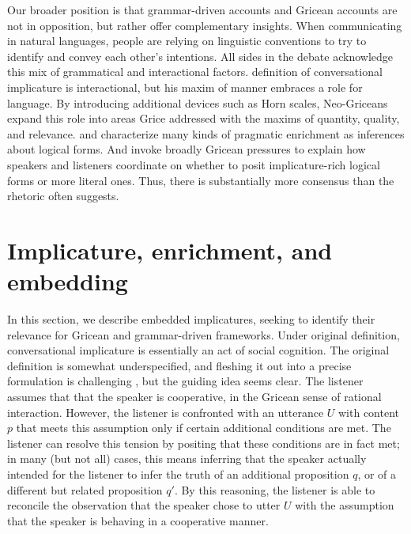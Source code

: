 \documentclass[leqno,12pt]{article}
\begin{document}
Our broader position is that grammar-driven accounts and Gricean
accounts are not in opposition, but rather offer complementary
insights.  When communicating in natural languages, people are relying
on linguistic conventions to try to identify and convey each other's
intentions. All sides in the debate acknowledge this mix of
grammatical and interactional factors.  definition
of conversational implicature is interactional, but his maxim of
manner embraces a role for language. By introducing additional devices such as Horn scales, Neo-Griceans expand this role
into areas Grice addressed with the maxims of quantity, quality, and
relevance. \citet{Sperber95} and \citet{Bach94} characterize many
kinds of pragmatic enrichment as inferences about logical forms. And
\citet{ChierchiaFoxSpector08} invoke broadly Gricean pressures to
explain how speakers and listeners coordinate on whether to posit
implicature-rich logical forms or more literal ones. Thus, there is
substantially more consensus than the rhetoric often suggests.


\section{Implicature, enrichment, and embedding}\label{sec:implicature}

In this section, we describe embedded implicatures, seeking to
identify their relevance for Gricean and grammar-driven
frameworks. Under  original definition,
conversational implicature is essentially an act of social
cognition. The original definition is somewhat underspecified, and
fleshing it out into a precise formulation is challenging
\citep{Hirschberg85}, but the guiding idea seems clear.  The listener
assumes that that the speaker is cooperative, in the Gricean sense of
rational interaction. However, the listener is confronted with an
utterance $U$ with content $p$ that meets this assumption only if certain additional conditions are met. The listener can resolve this tension by positing that these conditions are in fact met; in many (but not all) cases, this means inferring that the speaker actually
intended for the listener to infer the truth of an additional proposition $q$, or of a different but related proposition $q'$. By this reasoning, the listener is able to reconcile the observation that the speaker chose to utter $U$ with the
assumption that the speaker is behaving in a cooperative manner.
\end{document}
